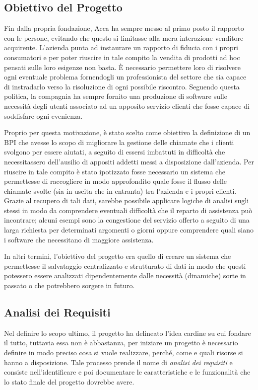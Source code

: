 \subsection{Obiettivo del Progetto}

Fin dalla propria fondazione, Acca ha sempre messo al primo posto il rapporto con le persone, evitando che questo si limitasse alla mera interazione venditore-acquirente. L'azienda punta ad instaurare un rapporto di fiducia con i propri consumatori e per poter riuscire in tale compito la vendita di prodotti ad hoc pensati sulle loro esigenze non basta. È necessario permettere loro di risolvere ogni eventuale problema fornendogli un professionista del settore che sia capace di instradarlo verso la risoluzione di ogni possibile riscontro. Seguendo questa politica, la compagnia ha sempre fornito una produzione di software sulle necessità degli utenti associato ad un apposito servizio clienti che fosse capace di soddisfare ogni evenienza.

Proprio per questa motivazione, è stato scelto come obiettivo la definizione di un BPI che avesse lo scopo di migliorare la gestione delle chiamate che i clienti svolgono per essere aiutati, a seguito di essersi imbattuti in difficoltà che necessitassero dell'ausilio di appositi addetti messi a disposizione dall'azienda. Per riuscire in tale compito è stato ipotizzato fosse necessario un sistema che permettesse di raccogliere in modo approfondito quale fosse il flusso delle chiamate svolte (sia in uscita che in entranta) tra l'azienda e i propri clienti. Grazie al recupero di tali dati, sarebbe possibile applicare logiche di analisi sugli stessi in modo da comprendere eventuali difficoltà che il reparto di assistenza può incontrare; alcuni esempi sono la congestione del servizio offerto a seguito di una larga richiesta per determinati argomenti o giorni oppure comprendere quali siano i software che necessitano di maggiore assistenza.

In altri termini, l'obiettivo del progetto era quello di creare un sistema che permettesse il salvataggio centralizzato e strutturato di dati in modo che questi potessero essere analizzati dipendentemente dalle necessità (dinamiche) sorte in passato o che potrebbero sorgere in futuro.

\subsection{Analisi dei Requisiti}

Nel definire lo scopo ultimo, il progetto ha delineato l'idea cardine su cui fondare il tutto, tuttavia essa non è abbastanza, per iniziare un progetto è necessario definire in modo preciso cosa si vuole realizzare, perché, come e quali risorse si hanno a disposizione. Tale processo prende il nome di \textit{analisi dei requisiti} e consiste nell'identificare e poi documentare le caratteristiche e le funzionalità che lo stato finale del progetto dovrebbe avere.

